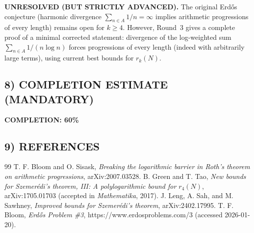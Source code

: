 \textbf{UNRESOLVED (BUT STRICTLY ADVANCED).}
The original Erd\H{o}s conjecture (harmonic divergence $\sum_{n\in A}1/n=\infty$ implies arithmetic progressions of every length) remains open for $k\ge 4$. However, Round~3 gives a complete proof of a minimal corrected statement: divergence of the log-weighted sum $\sum_{n\in A}1/(n\log n)$ forces progressions of every length (indeed with arbitrarily large terms), using current best bounds for $r_k(N)$.

\subsection{8) COMPLETION ESTIMATE (MANDATORY)}

\noindent\textbf{COMPLETION: 60\%}

\subsection{9) REFERENCES}

\begin{thebibliography}{99}
 T. F. Bloom and O. Sisask, \emph{Breaking the logarithmic barrier in Roth's theorem on arithmetic progressions}, arXiv:2007.03528.
 B. Green and T. Tao, \emph{New bounds for Szemer\'edi's theorem, III: A polylogarithmic bound for $r_4(N)$}, arXiv:1705.01703 (accepted in \emph{Mathematika}, 2017).
 J. Leng, A. Sah, and M. Sawhney, \emph{Improved bounds for Szemer\'edi's theorem}, arXiv:2402.17995.
 T. F. Bloom, \emph{Erd\H{o}s Problem \#3}, https://www.erdosproblems.com/3 (accessed 2026-01-20).
\end{thebibliography}
